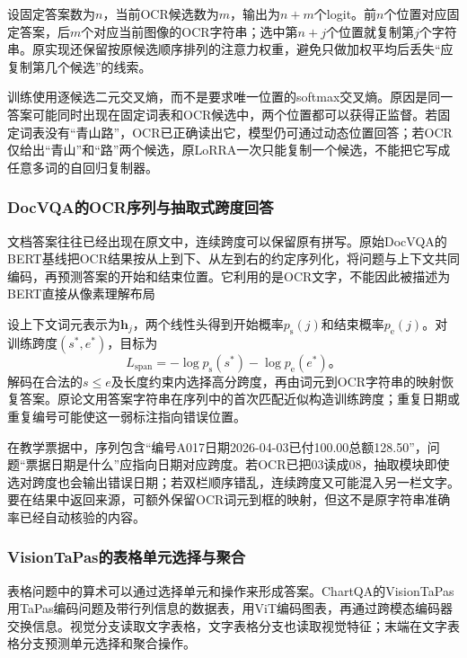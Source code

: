 设固定答案数为$n$，当前OCR候选数为$m$，输出为$n+m$个logit。前$n$个位置对应固定答案，后$m$个对应当前图像的OCR字符串；选中第$n+j$个位置就复制第$j$个字符串。原实现还保留按原候选顺序排列的注意力权重，避免只做加权平均后丢失“应复制第几个候选”的线索。

训练使用逐候选二元交叉熵，而不是要求唯一位置的softmax交叉熵。原因是同一答案可能同时出现在固定词表和OCR候选中，两个位置都可以获得正监督。若固定词表没有“青山路”，OCR已正确读出它，模型仍可通过动态位置回答；若OCR仅给出“青山”和“路”两个候选，原LoRRA一次只能复制一个候选，不能把它写成任意多词的自回归复制器。

\subsubsection{DocVQA的OCR序列与抽取式跨度回答}
\label{sec:vision-understanding-docvqa}

文档答案往往已经出现在原文中，连续跨度可以保留原有拼写。原始DocVQA的BERT基线把OCR结果按从上到下、从左到右的约定序列化，将问题与上下文共同编码，再预测答案的开始和结束位置。它利用的是OCR文字，不能因此被描述为BERT直接从像素理解布局

设上下文词元表示为$\bm h_j$，两个线性头得到开始概率$p_{\mathrm s}(j)$和结束概率$p_{\mathrm e}(j)$。对训练跨度$(s^*,e^*)$，目标为
\begin{equation}
  L_{\mathrm{span}}=-\log p_{\mathrm s}(s^*)-\log p_{\mathrm e}(e^*)\text{。}
  \label{eq:vision-docvqa-span}
\end{equation}
解码在合法的$s\leq e$及长度约束内选择高分跨度，再由词元到OCR字符串的映射恢复答案。原论文用答案字符串在序列中的首次匹配近似构造训练跨度；重复日期或重复编号可能使这一弱标注指向错误位置。

在教学票据中，序列包含“编号A017日期2026-04-03已付100.00总额128.50”，问题“票据日期是什么”应指向日期对应跨度。若OCR已把03读成08，抽取模块即使选对跨度也会输出错误日期；若双栏顺序错乱，连续跨度又可能混入另一栏文字。要在结果中返回来源，可额外保留OCR词元到框的映射，但这不是原字符串准确率已经自动核验的内容。

\subsubsection{VisionTaPas的表格单元选择与聚合}
\label{sec:vision-understanding-visiontapas}

表格问题中的算术可以通过选择单元和操作来形成答案。ChartQA的VisionTaPas用TaPas编码问题及带行列信息的数据表，用ViT编码图表，再通过跨模态编码器交换信息。视觉分支读取文字表格，文字表格分支也读取视觉特征；末端在文字表格分支预测单元选择和聚合操作。

